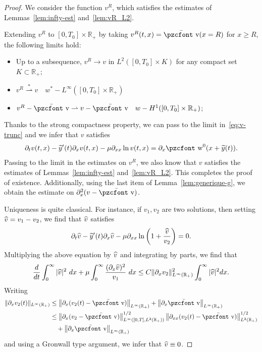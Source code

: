 \documentclass[10pt]{amsart}
\theoremstyle{definition}\newtheorem{defi}[theo]{Definition}\newtheorem{rema}[theo]{Remark}\newtheorem{exam}[theo]{Example}\newtheorem{exem}[theo]{Example}\newtheorem{nota}[theo]{Notation}
\newcommand{\mathpzc}[1]{\text{\pzcfont #1}}
\newcommand{\R}{\mathbb{R}}
\newcommand{\p}{\partial}
\newcommand{\bv}{\bar{\mathpzc{v}}}
\newcommand{\tw}{\mathpzc{w}}
\newcommand{\ty}{\widetilde{y}}
\let\oldhat\hat
\renewcommand*{\hat}[1]{\mathchoice{\widehat{#1}}{\widehat{#1}}{\oldhat{#1}}{\oldhat{#1}}}
\begin{document}
\begin{proof}
We consider the function $v^R$, which satisfies the estimates of Lemmas~\ref{lem:infty-est} and~\ref{lem:vR_L2}.

Extending $v^R$ to $[0,T_0] \times \R_+$ by taking $v^R(t,x)=\bv(x=R)$ for $x\geq R$, the following limits hold:
\begin{itemize}
\item Up to a subsequence, $v^R\to v$ in $L^2([0,T_0]\times K)$ for any compact set $K\subset \R_+$;
\item $v^R\stackrel{*}{\rightharpoonup} v\quad w^*-L^\infty([0,T_0]\times \R_+)$
\item $v^R-\bv \rightharpoonup v-\bv \quad w-H^1([0,T_0]\times \R_+)$;
\end{itemize}
Thanks to the strong compactness property, we can pass to the limit in~\eqref{eq:v-trunc} and we infer that $v$ satisfies
\begin{equation*}
\partial_t v(t,x) -\ty'(t) \partial_x v(t,x) - \mu \partial_{xx} \ln v(t,x) = \partial_x \tw^0(x+\ty(t)).
\end{equation*}
Passing to the limit in the estimates on $v^R$, we also know that $v$ satisfies the estimates of Lemmas~\ref{lem:infty-est} and~\ref{lem:vR_L2}. This completes the proof of existence. Additionally, using the last item of Lemma~\ref{lem:generique-g}, we obtain the estimate on $\p_x^2(v-\bv)$.

Uniqueness is quite classical. For instance, if $v_1,v_2$ are two solutions, then setting $\hat{v} =v_1-v_2$, we find that $\hat{v}$ satisfies
\[
\p_t \hat{v} - \ty'(t)\p_x \hat{v} - \mu \p_{xx} \ln \left(1+ \frac{\hat{v}}{v_2}\right)=0.
\]
Multiplying the above equation by $\hat{v}$ and integrating by parts, we find that
\[
\frac{d}{dt}\int_0^\infty |\hat{v} |^2 \ dx + \mu \int_0^\infty \frac{(\p_x \hat{v})^2}{v_1} \ dx
\leq C \|\p_x v_2 \|_{L^\infty(\R_+)}^2 \int_0^\infty |\hat{v}|^2 dx.
\]
Writing
\begin{align*}
\|\p_x v_2(t)\|_{L^\infty(\R_+)}&\leq \left\|\p_x (v_2(t)-\bv)\right\|_{L^\infty(\R_+)} + \left\|\p_x \bv\right\|_{L^\infty(\R_+)}\\
&\leq \left\|\p_x (v_2-\bv)\right\|^{1/2}_{L^\infty([0,T], L^2(\R_+))}\left\|\p_{xx} (v_2(t)-\bv)\right\|^{1/2}_{ L^2(\R_+)}\\&\quad
 + \left\|\p_x \bv\right\|_{L^\infty(\R_+)}
\end{align*}
and using a Gronwall type argument, we infer that $\hat{v} \equiv 0$.
\end{proof}
\end{document}
